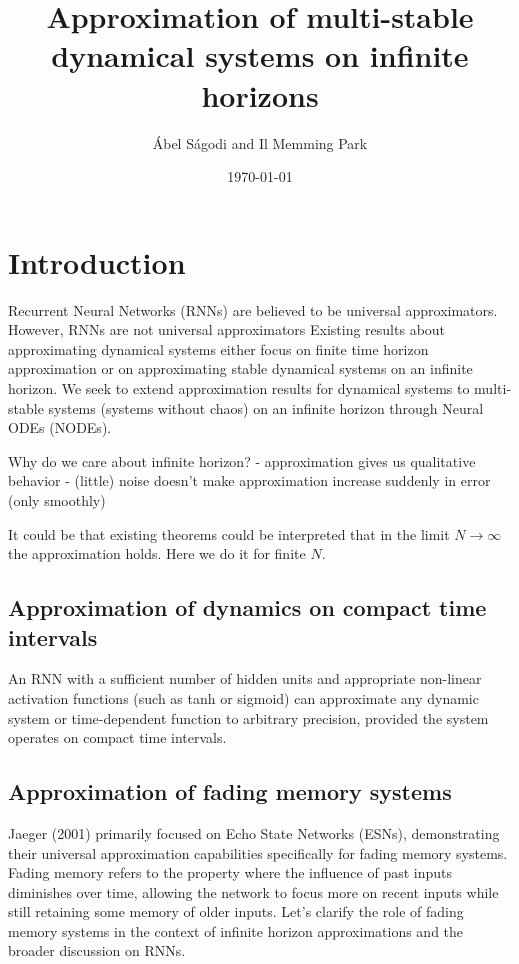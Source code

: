 \documentclass{article}
\title{Approximation of multi-stable dynamical systems on infinite horizons}
\author{\'Abel S\'agodi and Il Memming Park}
\date{\today}
\theoremstyle{definition}
\theoremstyle{remark}
\begin{document}
\maketitle

\section{Introduction}
Recurrent Neural Networks (RNNs) are believed to be universal approximators.
However, RNNs are not universal approximators 
Existing results about approximating dynamical systems either focus on finite time horizon approximation or on approximating stable dynamical systems on an infinite horizon.
We seek to extend approximation results for dynamical systems to multi-stable systems (systems without chaos) on an infinite horizon through Neural ODEs (NODEs).



Why do we care about infinite horizon?
- approximation gives us qualitative behavior
- (little) noise doesn't make approximation increase suddenly in error (only smoothly)


It could be that existing theorems could be interpreted that in the limit $N\rightarrow\infty$ the approximation holds.
Here we do it for finite $N$.


\subsection{Approximation of dynamics on compact time intervals}
An RNN with a sufficient number of hidden units and appropriate non-linear activation functions (such as tanh or sigmoid) can approximate any dynamic system or time-dependent function to arbitrary precision, provided the system operates on compact time intervals.


\subsection{Approximation of fading memory systems}
 Jaeger (2001) primarily focused on Echo State Networks (ESNs), demonstrating their universal approximation capabilities specifically for fading memory systems. Fading memory refers to the property where the influence of past inputs diminishes over time, allowing the network to focus more on recent inputs while still retaining some memory of older inputs. Let’s clarify the role of fading memory systems in the context of infinite horizon approximations and the broader discussion on RNNs.
\end{document}
